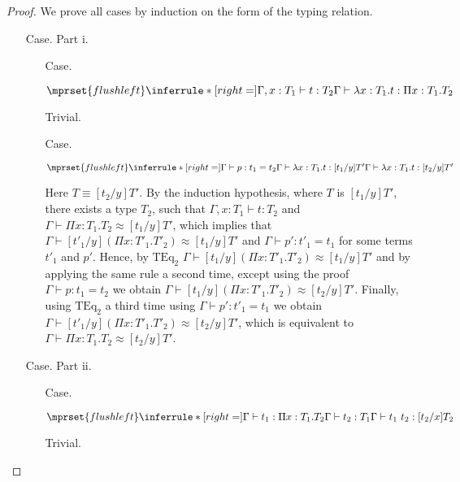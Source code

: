 \begin{proof}
  We prove all cases by induction on the form of the typing relation.

\begin{itemize}
\item[Case.] Part i.\\
  \begin{itemize}
  \item[Case.] \ \\
    \begin{center}
      \begin{math}
        $$\mprset{flushleft}
        \inferrule* [right=] {
          \Gamma,x : T_1 \vdash t : T_2
        }{\Gamma \vdash \lambda x : T_1.t : \Pi x:T_1.T_2}
      \end{math}
    \end{center}
    Trivial.
  
  \item[Case.] \ \\
    \begin{center}
      \begin{math}
        $$\mprset{flushleft}
        \inferrule* [right=] {
          \Gamma \vdash p:t_1 = t_2
          \\
          \Gamma \vdash \lambda x : T_1.t:[t_1/y]T'
        }{\Gamma \vdash \lambda x : T_1.t:[t_2/y]T'}
      \end{math}
    \end{center}
    Here $T \equiv [t_2/y]T'$.  By the induction hypothesis, where $T$ is 
    $[t_1/y]T'$, there exists a type $T_2$, such that $\Gamma,x:T_1 \vdash t:T_2$ and
    $\Gamma \vdash \Pi x:T_1.T_2 \approx [t_1/y]T'$, which implies that 
    $\Gamma \vdash [t'_1/y](\Pi x:T'_1.T'_2) \approx [t_1/y]T'$ and
    $\Gamma \vdash p':t'_1 = t_1$ for some terms $t'_1$ and $p'$.  Hence, by $\text{TEq}_2$
    $\Gamma \vdash [t_1/y](\Pi x:T'_1.T'_2) \approx [t_1/y]T'$ and by applying the same
    rule a second time, except using the proof $\Gamma \vdash p:t_1 = t_2$ we obtain
    $\Gamma \vdash [t_1/y](\Pi x:T'_1.T'_2) \approx [t_2/y]T'$.  Finally, using 
    $\text{TEq}_2$ a third time using $\Gamma \vdash p':t'_1 = t_1$ we obtain
    $\Gamma \vdash [t'_1/y](\Pi x:T'_1.T'_2) \approx [t_2/y]T'$, which is equivalent to
    $\Gamma \vdash \Pi x:T_1.T_2 \approx [t_2/y]T'$.
  \end{itemize}
  
\item[Case.] Part ii.\\
  \begin{itemize}
  \item[Case.] \ \\
    \begin{center}
      \begin{math}
        $$\mprset{flushleft}
        \inferrule* [right=] {
          \Gamma \vdash t_1 : \Pi x:T_1.T_2 
          \\
          \Gamma \vdash t_2 : T_1
        }{\Gamma \vdash t_1\ t_2 : [t_2/x]T_2}
      \end{math}  
    \end{center}
    Trivial.
    

\end{itemize}
\end{itemize}
\end{proof}
